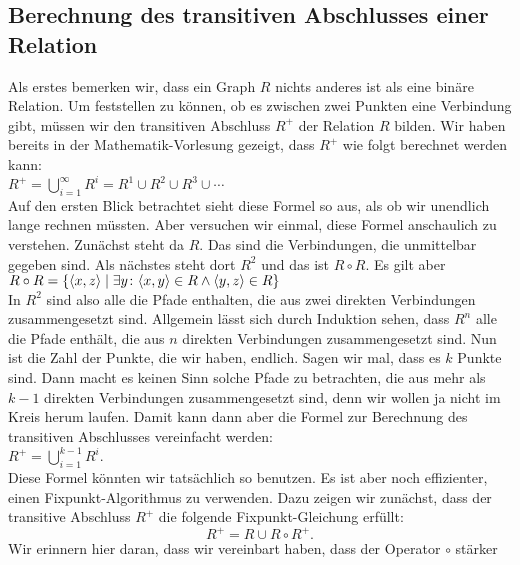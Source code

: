 \subsection{Berechnung des transitiven Abschlusses einer Relation}
Als erstes bemerken wir, dass ein Graph $R$ nichts anderes ist als eine bin\"{a}re Relation.
Um feststellen zu k\"{o}nnen, ob es zwischen zwei Punkten eine Verbindung gibt,
m\"{u}ssen wir den transitiven Abschluss $R^+$ der Relation $R$ bilden.  Wir haben bereits
in der Mathematik-Vorlesung gezeigt, dass $R^+$ wie folgt
berechnet werden kann: \\[0.2cm]
\hspace*{1.3cm} $R^+ = \bigcup\limits_{i=1}^{\infty} R^i = R^1 \cup R^2 \cup R^3 \cup \cdots$  \\[0.2cm]
Auf den ersten Blick betrachtet sieht diese Formel so aus, als ob wir unendlich
lange rechnen m\"{u}ssten.  Aber versuchen wir einmal, diese Formel anschaulich zu
verstehen.  Zun\"{a}chst steht da $R$.  Das sind die Verbindungen, die unmittelbar  gegeben
sind.  Als n\"{a}chstes steht dort $R^2$ und das ist $R \circ R$.  Es gilt aber \\[0.2cm]
\hspace*{1.3cm} $R \circ R = \{ \pair(x,z) \mid \exists y \colon \pair(x,y) \in R \wedge \pair(y,z) \in R \}$
\\[0.2cm]
In $R^2$ sind also alle die Pfade enthalten, die aus zwei direkten Verbindungen
zusammengesetzt sind.  Allgemein l\"{a}sst sich durch Induktion sehen, dass $R^n$
alle die Pfade enth\"{a}lt, die aus $n$ direkten Verbindungen zusammengesetzt sind.  Nun
ist die Zahl der Punkte, die wir haben, endlich.  Sagen wir mal, dass es
$k$ Punkte sind.  Dann macht es  keinen Sinn solche Pfade zu betrachten, die
aus mehr als $k-1$ direkten Verbindungen zusammengesetzt sind, denn wir wollen ja
nicht im Kreis herum laufen.  Damit kann dann aber die Formel zur Berechnung des
transitiven Abschlusses vereinfacht werden:\\[0.2cm]
\hspace*{1.3cm} 
$R^+ = \bigcup\limits_{i=1}^{k-1} R^i$.
\\[0.2cm]
Diese Formel k\"{o}nnten wir tats\"{a}chlich so benutzen.  Es ist aber noch effizienter,
einen Fixpunkt-Algorithmus zu verwenden.  Dazu zeigen wir zun\"{a}chst, dass der transitive
Abschluss $R^+$ die folgende Fixpunkt-Gleichung erf\"{u}llt:
\begin{equation}
  \label{fixpunkt}
  R^+ = R \cup R \circ R^+. 
\end{equation}
Wir erinnern hier daran, dass wir vereinbart haben, dass der Operator $\circ$ st\"{a}rker
